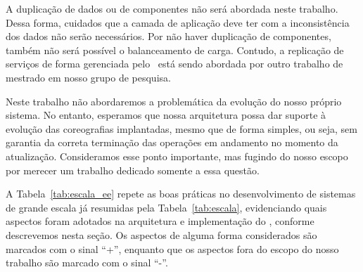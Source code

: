 A duplicação de dados ou de componentes não será abordada neste trabalho. Dessa forma, cuidados que a camada de aplicação deve ter com a inconsistência dos dados não serão necessários. Por não haver duplicação de componentes, também não será possível o balanceamento de carga. Contudo, a replicação de serviços de forma gerenciada pelo \ee\ está sendo abordada por outro trabalho de mestrado em nosso grupo de pesquisa.

Neste trabalho não abordaremos a problemática da evolução do nosso próprio sistema. No entanto, esperamos que nossa arquitetura possa dar suporte à evolução das coreografias implantadas, mesmo que de forma simples, ou seja, sem garantia da correta terminação das operações em andamento no momento da atualização. Consideramos esse ponto importante, mas fugindo do nosso escopo por merecer um trabalho dedicado somente a essa questão.

A Tabela~\ref{tab:escala_ee} repete as boas práticas no desenvolvimento de sistemas de grande escala já resumidas pela Tabela~\ref{tab:escala}, evidenciando quais aspectos foram adotados na arquitetura e implementação do \ee, conforme descrevemos nesta seção. Os aspectos de alguma forma considerados são marcados com o sinal ``+'', enquanto que os aspectos fora do escopo do nosso trabalho são marcado com o sinal ``-''. 


